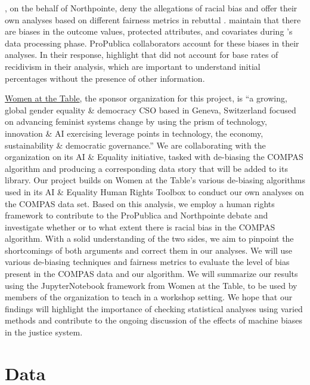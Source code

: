 \documentclass[water,article,submit,moreauthors,pdftex]{mdpi}
\begin{document}
\citet{equivant_response_2016}, on the behalf of Northpointe, deny the
allegations of racial bias and offer their own analyses based on
different fairness metrics in rebuttal \citep{equivant_response_2016}.
\citet{angwin2016machine} maintain that there are biases in the outcome
values, protected attributes, and covariates during
\citet{equivant_response_2016}'s data processing phase. ProPublica
collaborators \citet{larson2016we} account for these biases in their
analyses. In their response, \citet{equivant_response_2016} highlight
that \citet{angwin2016machine} did not account for base rates of
recidivism in their analysis, which are important to understand initial
percentages without the presence of other information.

\href{https://www.womenatthetable.net/}{Women at the Table}, the sponsor
organization for this project, is ``a growing, global gender equality \&
democracy CSO based in Geneva, Switzerland focused on advancing feminist
systems change by using the prism of technology, innovation \& AI
exercising leverage points in technology, the economy, sustainability \&
democratic governance.'' We are collaborating with the organization on
its AI \& Equality \citep{noauthor_ai_nodate} initiative, tasked with
de-biasing the COMPAS algorithm \citep{aif360-oct-2018} and producing a
corresponding data story that will be added to its library. Our project
builds on Women at the Table's various de-biasing algorithms used in its
AI \& Equality Human Rights Toolbox to conduct our own analyses on the
COMPAS data set. Based on this analysis, we employ a human rights
framework to contribute to the ProPublica and Northpointe debate and
investigate whether or to what extent there is racial bias in the COMPAS
algorithm. With a solid understanding of the two sides, we aim to
pinpoint the shortcomings of both arguments and correct them in our
analyses. We will use various de-biasing techniques and fairness metrics
to evaluate the level of bias present in the COMPAS data and our
algorithm. We will summarize our results using the JupyterNotebook
framework from Women at the Table, to be used by members of the
organization to teach in a workshop setting. We hope that our findings
will highlight the importance of checking statistical analyses using
varied methods and contribute to the ongoing discussion of the effects
of machine biases in the justice system.

\hypertarget{data}{%
\section{Data}\label{data}}
\end{document}
